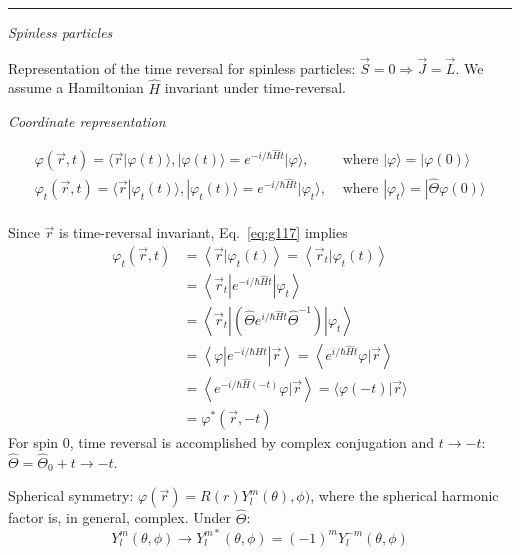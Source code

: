 \documentclass[12pt]{article}
\newcommand{\be}{\begin{equation}}
\newcommand{\ee}{\end{equation}}
\begin{document}
\par\noindent\rule{\textwidth}{1pt}


\emph{Spinless particles}

Representation of the time reversal for spinless particles:
$\vec{S}=0 \Rightarrow \vec{J}=\vec{L}$.
We assume a Hamiltonian $\hat{H}$ invariant under time-reversal.

\emph{Coordinate representation}

\[
\begin{aligned}
\varphi(\vec{r}, t)=    \langle\vec{r} | \varphi(t)\rangle, 
|\varphi(t)\rangle    =e^{-i / \hbar \hat{H} t} | \varphi\rangle,
&\text{ where } |\varphi\rangle = |\varphi(0)\rangle\\
\varphi_{t}(\vec{r}, t)=\langle\vec{r} | \varphi_{t}(t)\rangle, 
|\varphi_{t}(t)\rangle=e^{-i / \hbar \hat{H} t} |\varphi_{t}\rangle,
&\text{ where } |\varphi_t\rangle = |\hat{\Theta}\varphi(0)\rangle\\ 
\end{aligned}
\]

Since $\vec{r}$ is time-reversal invariant, Eq.~\eqref{eq:g117} %
implies
\be
\begin{aligned}
\varphi_{t}(\vec{r}, t)
&=\left\langle\vec{r} | \varphi_{t}(t)\right\rangle=\left\langle\vec{r}_{t} | \varphi_{t}(t)\right\rangle\\
&=\left\langle\vec{r}_{t}\left|e^{-i / \hbar \hat{H} t}\right| \varphi_{t}\right\rangle\\
&=\left\langle\vec{r}_{t}\left|\left(\hat{\Theta} e^{i / \hbar \hat{H} t} \hat{\Theta}^{-1}\right)\right| \varphi_{t}\right\rangle\\
&=\left\langle\varphi\left|e^{-i / \hbar H t}\right| \vec{r}\right\rangle=\left\langle e^{i / \hbar \hat{H} t} \varphi | \vec{r}\right\rangle\\
&=\left\langle e^{-i / \hbar \hat{H}(-t)} \varphi | \vec{r}\right\rangle=\langle\varphi(-t) | \vec{r}\rangle\\
&=\varphi^{*}(\vec{r},-t)
\end{aligned}
\ee
For spin 0, time reversal is accomplished by
complex conjugation and $t \to -t$:
$\hat{\Theta} = \hat{\Theta}_0 + t\to-t$. 

Spherical symmetry: $\varphi(\vec{r}) = R(r) Y^m_l(\theta),\phi)$,
where the spherical harmonic factor is, in general, complex.
Under $\hat{\Theta}$:
\be
Y_{l}^{m}(\theta, \phi) \rightarrow Y_{l}^{m *}(\theta, \phi)=(-1)^{m} Y_{l}^{- m}(\theta, \phi)
\ee
\end{document}
